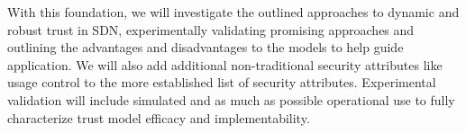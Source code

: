 \documentclass[10pt,conference]{IEEEtran}
\begin{document}
With this foundation, we will investigate the outlined approaches to dynamic and robust trust in SDN, experimentally validating promising approaches and outlining the advantages and disadvantages to the models to help guide application.  We will also add additional non-traditional security attributes like usage control to the more established list of security attributes.  Experimental validation will include simulated and as much as possible operational use to fully characterize trust model efficacy and implementability.

\printbibliography
\end{document}

